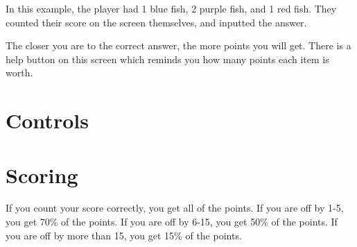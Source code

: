 \documentclass[12pt]{book}
\begin{document}
		In this example, the player had 1 blue fish, 2 purple fish, and 1 red fish. They counted their score on the screen themselves, and inputted the answer.

		The closer you are to the correct answer, the more points you will get. There is a help button on this screen which reminds you how many points each item is worth.
		\section{Controls}
		\section{Scoring}
			If you count your score correctly, you get all of the points. If you are off by 1-5, you get 70\% of the points. If you are off by 6-15, you get 50\% of the points. If you are off by more than 15, you get 15\% of the points.
\end{document}

